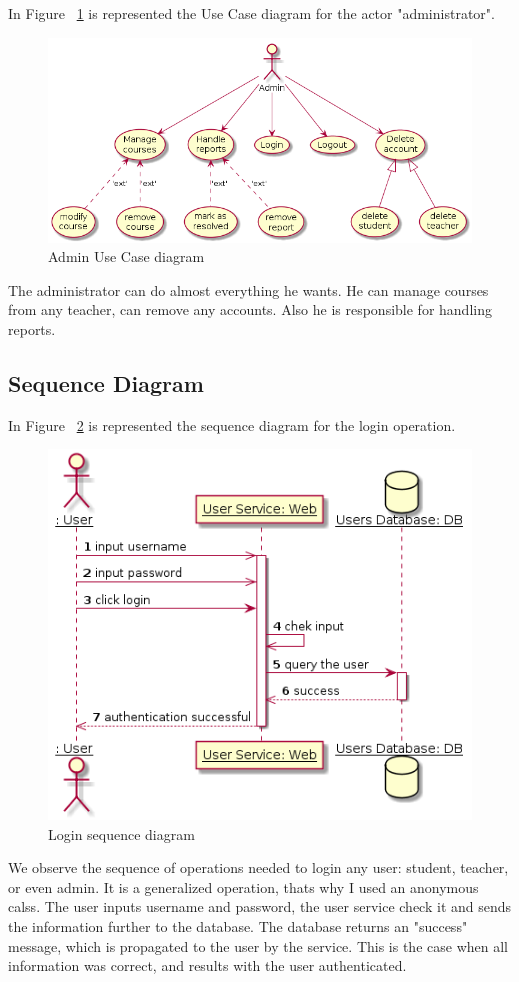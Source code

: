 \documentclass[12pt,a4paper,titlepage]{article}
\begin{document}
In Figure ~\ref{fig:2admin} is represented the Use Case diagram for the actor "administrator".
\begin{figure}[H]
\centering
\includegraphics[width=\textwidth]{2admin}
\caption{Admin Use Case diagram}
\label{fig:2admin}
\end{figure}

The administrator can do almost everything he wants. He can manage courses from any teacher, can remove any accounts. Also he is responsible for handling reports.

\subsection{Sequence Diagram}
In Figure ~\ref{fig:3login} is represented the sequence diagram for the login operation.
\begin{figure}[H]
	\centering
	\includegraphics[width=15cm]{3login}
	\caption{Login sequence diagram}
	\label{fig:3login}
\end{figure}
We observe the sequence of operations needed to login any user: student, teacher, or even admin. It is a generalized operation, thats why I used an anonymous calss. The user inputs username and password, the user service check it and sends the information further to the database. The database returns an "success" message, which is propagated to the user by the service. This is the case when all information was correct, and results with the user authenticated.\par
\end{document}
